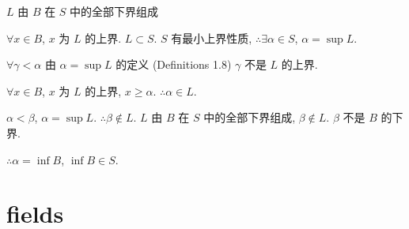 $L$ 由 $B$ 在 $S$ 中的全部下界组成

$\forall x\in B$, $x$ 为 $L$ 的上界. $L\subset S$.
$S$ 有最小上界性质,
$\therefore \exists \alpha\in S$, $\alpha = \sup L$.

$\forall \gamma <\alpha$ 由 $\alpha = \sup L$ 的定义 (Definitions 1.8)
$\gamma$ 不是 $L$ 的上界.

$\forall x \in B$, $x$ 为 $L$ 的上界, $x \geq \alpha$. $\therefore \alpha \in L$.

$\alpha < \beta$, $\alpha = \sup L$. $\therefore \beta \not\in L$.
$L$ 由 $B$ 在 $S$ 中的全部下界组成, $\beta \not\in L$.
$\beta$ 不是 $B$ 的下界.

$\therefore \alpha = \inf B$, $\inf B\in S$.


\section{fields}
